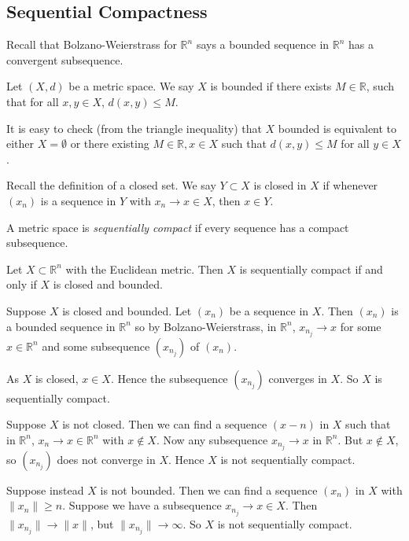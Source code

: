 \documentclass[12pt]{article}
\begin{document}
\subsection{Sequential Compactness}%
\label{sub:sequential_compactness}

Recall that Bolzano-Weierstrass for $\mathbb{R}^{n}$ says a bounded sequence in $\mathbb{R}^{n}$ has a convergent subsequence.

\begin{definition}
	Let $(X, d)$ be a metric space. We say $X$ is bounded if there exists $M \in \mathbb{R}$, such that for all $x, y \in X$, $d(x, y) \leq M$.
\end{definition}

\begin{remark}
	It is easy to check (from the triangle inequality) that $X$ bounded is equivalent to either $X = \emptyset$ or there existing $M \in \mathbb{R}, x \in X$ such that $d(x, y) \leq M$ for all $y \in X$.
\end{remark}

Recall the definition of a closed set. We say $Y \subset X$ is closed in $X$ if whenever $(x_n)$ is a sequence in $Y$ with $x_n \to x \in X$, then $x \in Y$.

\begin{definition}
	A metric space is \textit{sequentially compact} if every sequence has a compact subsequence.
\end{definition}

\begin{theorem}
	Let $X \subset \mathbb{R}^{n}$ with the Euclidean metric. Then $X$ is sequentially compact if and only if $X$ is closed and bounded.
\end{theorem}

\begin{proofbox}
	Suppose $X$ is closed and bounded. Let $(x_n)$ be a sequence in $X$. Then $(x_n)$ is a bounded sequence in $\mathbb{R}^{n}$ so by Bolzano-Weierstrass, in $\mathbb{R}^{n}$, $x_{n_j} \to x$ for some $x \in \mathbb{R}^{n}$ and some subsequence $(x_{n_j})$ of $(x_n)$. 

	As $X$ is closed, $x \in X$. Hence the subsequence $(x_{n_j})$ converges in $X$. So $X$ is sequentially compact.

	Suppose $X$ is not closed. Then we can find a sequence $(x-n)$ in $X$ such that in $\mathbb{R}^{n}$, $x_n \to x \in \mathbb{R}^{n}$ with $x \not \in X$. Now any subsequence $x_{n_j} \to x$ in $\mathbb{R}^{n}$. But $x \not \in X$, so $(x_{n_j})$ does not converge in $X$. Hence $X$ is not sequentially compact.

	Suppose instead $X$ is not bounded. Then we can find a sequence $(x_n)$ in $X$ with $\|x_n\| \geq n$. Suppose we have a subsequence $x_{n_j}\to x \in X$. Then $\|x_{n_j}\| \to \|x\|$, but $\|x_{n_j}\| \to \infty$. So $X$ is not sequentially compact.
\end{proofbox}
\end{document}
